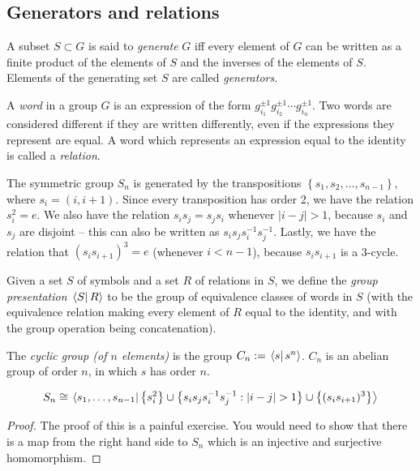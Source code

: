 \documentclass[class=article, crop=false]{standalone}
\begin{document}
\subsection{Generators and relations}
A subset $S \subset G$ is said to \emph{generate} $G$ iff every element of $G$ can be written as a finite product of the elements of $S$ and the inverses of the elements of $S$. Elements of the generating set $S$ are called \emph{generators}.
\par
A \emph{word} in a group $G$ is an expression of the form $g_{i_1}^{\pm 1} g_{i_2}^{\pm 1} \cdots g_{i_n}^{\pm 1}$. Two words are considered different if they are written differently, even if the expressions they represent are equal. A word which represents an expression equal to the identity is called a \emph{relation}.
\begin{example}
    The symmetric group $S_n$ is generated by the transpositions $ \left\{ s_1, s_2, \dots, s_{n-1} \right\}$, where $s_i = (i, i+1)$. Since every transposition has order 2, we have the relation $s_i^2=e$. We also have the relation $s_is_j=s_js_i$ whenever $|i-j|>1$, because $s_i$ and $s_j$ are disjoint -- this can also be written as $s_is_js_i^{-1}s_j^{-1}$. Lastly, we have the relation that $(s_is_{i+1})^3=e$ (whenever $i<n-1$), because $s_is_{i+1}$ is a 3-cycle.
\end{example}
Given a set $S$ of symbols and a set $R$ of relations in $S$, we define the \emph{group presentation} $ \left.\left\langle S\right\vert R \right\rangle$ to be the group of equivalence classes of words in $S$ (with the equivalence relation making every element of $R$ equal to the identity, and with the group operation being concatenation).
\par
The \emph{cyclic group (of $n$ elements)} is the group $C_n := \left.\left\langle s\right\vert s^n \right\rangle$. $C_n$ is an abelian group of order $n$, in which $s$ has order $n$.
\begin{prop}
    \[ S_n \cong \braket{s_1, \dots, s_{n-1}}{ \left\{ s_i^2 \right\} \cup \left\{ s_is_js_i^{-1}s_j^{-1} : |i-j|>1 \right\} \cup \left\{ (s_is_{i+1})^3 \right\}} \]
\end{prop}
\begin{proof}
    The proof of this is a painful exercise. You would need to show that there is a map from the right hand side to $S_n$ which is an injective and surjective homomorphism.
\end{proof}
\end{document}
